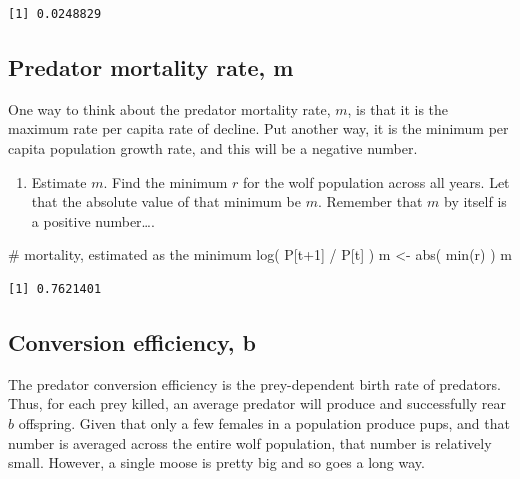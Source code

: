 \documentclass[
  letterpaper,
  DIV=11,
  numbers=noendperiod]{scrreprt}
\newenvironment{Shaded}{\begin{snugshade}}{\end{snugshade}}
\newcommand{\CommentTok}[1]{\textcolor[rgb]{0.37,0.37,0.37}{#1}}
\newcommand{\FunctionTok}[1]{\textcolor[rgb]{0.28,0.35,0.67}{#1}}
\newcommand{\NormalTok}[1]{\textcolor[rgb]{0.00,0.23,0.31}{#1}}
\newcommand{\OtherTok}[1]{\textcolor[rgb]{0.00,0.23,0.31}{#1}}
\newcommand{\SpecialCharTok}[1]{\textcolor[rgb]{0.37,0.37,0.37}{#1}}
\providecommand{\tightlist}{%
  \setlength{\itemsep}{0pt}\setlength{\parskip}{0pt}}
\begin{document}
\begin{Shaded}
\end{Shaded}

\begin{verbatim}
[1] 0.0248829
\end{verbatim}

\subsection{Predator mortality rate, m}\label{predator-mortality-rate-m}

One way to think about the predator mortality rate, \(m\), is that it is
the maximum rate per capita rate of decline. Put another way, it is the
minimum per capita population growth rate, and this will be a negative
number.

\begin{enumerate}
\def\labelenumi{\arabic{enumi}.}
\setcounter{enumi}{7}
\tightlist
\item
  Estimate \(m\). Find the minimum \(r\) for the wolf population across
  all years. Let that the absolute value of that minimum be \(m\).
  Remember that \(m\) by itself is a positive number\ldots.
\end{enumerate}

\begin{Shaded}
\begin{Highlighting}[]
\CommentTok{\# mortality, estimated as the minimum log( P[t+1] / P[t] )}
\NormalTok{m }\OtherTok{\textless{}{-}} \FunctionTok{abs}\NormalTok{( }\FunctionTok{min}\NormalTok{(r) )}
\NormalTok{m}
\end{Highlighting}
\end{Shaded}

\begin{verbatim}
[1] 0.7621401
\end{verbatim}

\subsection{Conversion efficiency, b}\label{conversion-efficiency-b}

The predator conversion efficiency is the prey-dependent birth rate of
predators. Thus, for each prey killed, an average predator will produce
and successfully rear \(b\) offspring. Given that only a few females in
a population produce pups, and that number is averaged across the entire
wolf population, that number is relatively small. However, a single
moose is pretty big and so goes a long way.
\end{document}
